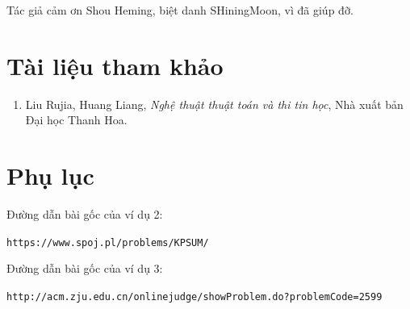 \documentclass[11pt]{article}
\begin{document}
Tác giả cảm ơn Shou Heming, biệt danh SHiningMoon, vì đã giúp đỡ.

\section*{Tài liệu tham khảo}

\begin{enumerate}
  \item Liu Rujia, Huang Liang, \textit{Nghệ thuật thuật toán và thi tin học},
  Nhà xuất bản Đại học Thanh Hoa.
\end{enumerate}

\section*{Phụ lục}

Đường dẫn bài gốc của ví dụ 2:
\begin{center}
\texttt{https://www.spoj.pl/problems/KPSUM/}
\end{center}

Đường dẫn bài gốc của ví dụ 3:
\begin{center}
\texttt{http://acm.zju.edu.cn/onlinejudge/showProblem.do?problemCode=2599}
\end{center}
\end{document}
